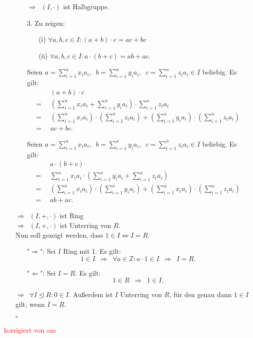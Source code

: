 \documentclass[12pt]{article}
\newcommand{\corr}[1]{\textcolor{red}{#1}}
\newcommand{\QED}{\begin{flushright} $\square$ \end{flushright}}
\newcommand{\df}{\Longrightarrow \enspace}
\begin{document}
\begin{enumerate}
\begin{enumerate}
$\df (I,\cdot)$ ist Halbgruppe.

\item[3.] Zu zeigen:
\begin{enumerate}
	\item[(i)] $\forall a, b, c \in I: (a + b) \cdot c  = a c + b c$
	\item[(ii)] $\forall a, b, c \in I: a \cdot (b + c) = a b + a c$.
\end{enumerate}

Seien $a = \sum\limits_{i=1}^{n}x_i a_i, \enspace b = \sum\limits_{i=1}^{n}y_i a_i, \enspace c = \sum\limits_{i=1}^{n}z_i a_i \in I$ beliebig. Es gilt:
\begin{align*}
	&(a + b) \cdot c \\
	= \enspace &(\sum_{i=1}^{n}x_i a_i + \sum_{i=1}^{n}y_i a_i) \cdot \sum_{i=1}^{n}z_i a_i \\
	= \enspace &(\sum_{i=1}^{n}x_i a_i) \cdot (\sum_{i=1}^{n}z_i a_i) + (\sum_{i=1}^{n}y_i a_i) \cdot (\sum_{i=1}^{n}z_i a_i) \\
	= \enspace &a c + b c.
\end{align*}

Seien $a = \sum\limits_{i=1}^{n}x_i a_i, \enspace b = \sum\limits_{i=1}^{n}y_i a_i, \enspace c = \sum\limits_{i=1}^{n}z_i a_i \in I$ beliebig. Es gilt:
\begin{align*}
	&a \cdot (b + c) \\
	= \enspace &\sum_{i=1}^{n}x_i a_i \cdot (\sum_{i=1}^{n}y_i a_i + \sum_{i=1}^{n}z_i a_i) \\
	= \enspace &(\sum_{i=1}^{n}x_i a_i) \cdot (\sum_{i=1}^{n}y_i a_i) + (\sum_{i=1}^{n}x_i a_i) \cdot (\sum_{i=1}^{n}z_i a_i) \\
	= \enspace &a b + a c.
\end{align*}

\end{enumerate}

$\df (I,+,\cdot)$ ist Ring \\
$\df (I,+,\cdot)$ ist Unterring von $R$. \\

Nun soll gezeigt werden, dass $1 \in I \Longleftrightarrow I = R$.
\begin{enumerate}
	\item["$\Longrightarrow$":] Sei $I$ Ring mit 1. Es gilt:
	$$1 \in I \enspace \df \forall a \in \mathbb{Z}: a \cdot 1 \in I \enspace \df I = R.$$
	
	\item["$\Longleftarrow$":] Sei $I = R$. Es gilt:
	$$1 \in R \enspace \df 1 \in I.$$

\end{enumerate}

$\df \forall I \trianglelefteq R: 0 \in I.$ Außerdem ist
$I$ Unterring von $R$, für den genau dann $1 \in I$ gilt, wenn $I = R$. 
\QED

\end{enumerate}


\bigskip

\corr{korrigiert von \hspace{1cm} am }
\end{document}
